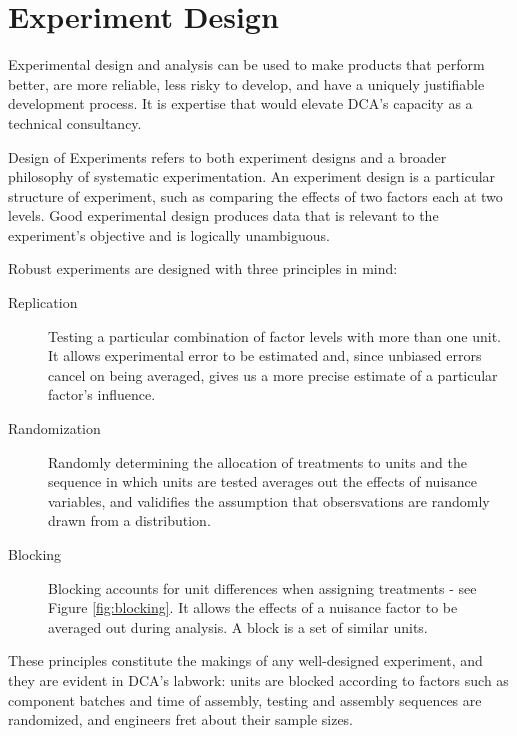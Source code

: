 \documentclass[11pt,a4paper,article]{memoir} %
\begin{document}
\section{Experiment Design}
Experimental design and analysis can be used to make products that perform better, are more reliable, less risky to develop, and have a uniquely justifiable development process. It is expertise that would elevate DCA's capacity as a technical consultancy.
\par
Design of Experiments refers to both experiment designs and a broader philosophy of systematic experimentation. An experiment design is a particular structure of experiment, such as comparing the effects of two factors each at two levels. Good experimental design produces data that is relevant to the experiment's objective and is logically unambiguous.
\par
Robust experiments are designed with three principles in mind:
\begin{description}
\item[Replication]{Testing a particular combination of factor levels with more than one unit. It allows experimental error to be estimated and, since unbiased errors cancel on being averaged, gives us a more precise estimate of a particular factor's influence.}
\item[Randomization]{Randomly determining the allocation of treatments to units and the sequence in which units are tested averages out the effects of nuisance variables, and validifies the assumption that obsersvations are randomly drawn from a distribution.}
\item[Blocking]{Blocking accounts for unit differences when assigning treatments - see Figure \ref{fig:blocking}. It allows the effects of a nuisance factor to be averaged out during analysis. A block is a set of similar units.}
\end{description}
These principles constitute the makings of any well-designed experiment, and they are evident in DCA's labwork: units are blocked according to factors such as component batches and time of assembly, testing and assembly sequences are randomized, and engineers fret about their sample sizes. 
\end{document}
